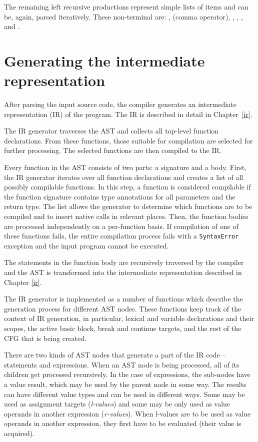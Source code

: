 The remaining left recursive productions represent simple lists of items and can be, again, parsed iteratively. These non-terminal are: \nonterminal[FormalParameters]{}{}, \nonterminal[Expression]{}{} (comma operator), \nonterminal[LexicalDeclaration]{}{}, \nonterminal[VariableDeclaration]{}{}, \nonterminal[Arguments]{}{}, and \nonterminal[StatementList]{}{}.


\section{Generating the intermediate representation}

After parsing the input source code, the compiler generates an intermediate representation (IR) of the program. The IR is described in detail in Chapter~\ref{ir}.

The IR generator traverses the AST and collects all top-level function declarations. From these functions, those suitable for compilation are selected for further processing. The selected functions are then compiled to the IR.

Every function in the AST consists of two parts: a signature and a body. First, the IR generator iterates over all function declarations and creates a list of all possibly compilable functions. In this step, a function is considered compilable if the function signature contains type annotations for all parameters and the return type. The list allows the generator to determine which functions are to be compiled and to insert native calls in relevant places. Then, the function bodies are processed independently on a per-function basis. If compilation of one of these functions fails, the entire compilation process fails with a \texttt{SyntaxError} exception and the input program cannot be executed.

The statements in the function body are recursively traversed by the compiler and the AST is transformed into the intermediate representation described in Chapter \ref{ir}.

The IR generator is implemented as a number of functions which describe the generation process for different AST nodes. These functions keep track of the context of IR generation, in particular, lexical and variable declarations and their scopes, the active basic block, break and continue targets, and the rest of the CFG that is being created.

There are two kinds of AST nodes that generate a part of the IR code -- statements and expressions. When an AST node is being processed, all of its children get processed recursively. In the case of expressions, the sub-nodes have a value result, which may be used by the parent node in some way. The results can have different value types and can be used in different ways. Some may be used as assignment targets (\textit{l-values}) and some may be only used as value operands in another expression (\textit{r-values}). When l-values are to be used as value operands in another expression, they first have to be evaluated (their value is acquired).

